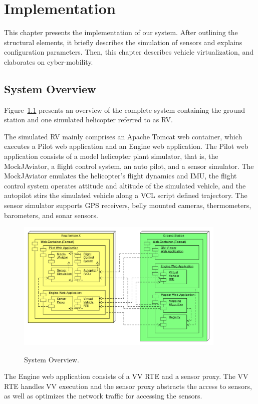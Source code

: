 
\chapter{Implementation}

This chapter presents the implementation of our system.
After outlining the structural elements, it briefly describes the simulation of sensors and explains
configuration parameters. Then, this chapter describes vehicle virtualization, and elaborates on cyber-mobility.

\section{System Overview}

Figure~\ref{fig:SystemOverview} presents an overview of the complete system containing
the ground station and one simulated helicopter referred to as \ac{RV}.

The simulated \ac{RV} mainly comprises an Apache Tomcat web container, which executes a
Pilot web application and an Engine web application.
%
The Pilot web application consists of a model helicopter plant simulator, that is, the MockJAviator,
a flight control system, an auto pilot, and a sensor simulator.
The MockJAviator emulates the helicopter's flight dynamics and \ac{IMU},
the flight control system operates attitude and altitude of the simulated vehicle, 
and the autopilot stirs the simulated vehicle along a \ac{VCL} script defined trajectory.
The sensor simulator supports GPS receivers, belly mounted cameras, thermometers, barometers,
and sonar sensors.
\begin{figure}[h]
	\begin{center}
		{\includegraphics[width=10cm]{SystemOverview.pdf}}
	\end{center}
	\caption{System Overview.\label{fig:SystemOverview}}
\end{figure}
The Engine web application consists of a \ac{VV RTE} and a sensor proxy. The \ac{VV RTE}
handles \ac{VV} execution and the sensor proxy abstracts the access to sensors, as well as
optimizes the network traffic for accessing the sensors.

